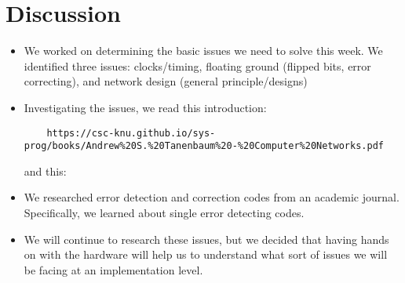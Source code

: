 \documentclass{article}
\begin{document}
\section*{Discussion}
\begin{itemize}
\item We worked on determining the basic issues we need to solve this week. We identified three issues: clocks/timing, floating ground (flipped bits, error correcting), and network design (general principle/designs)
\item Investigating the issues, we read this introduction: \begin{verbatim}
    https://csc-knu.github.io/sys-prog/books/Andrew%20S.%20Tanenbaum%20-%20Computer%20Networks.pdf
\end{verbatim} and this:
\item We researched error detection and correction codes from an academic journal. Specifically, 
we learned about single error detecting codes.
\item We will continue to research these issues, but we decided that having hands on with the hardware will help us to understand what sort of issues we will be facing at an implementation level.
\end{itemize}
\end{document}
